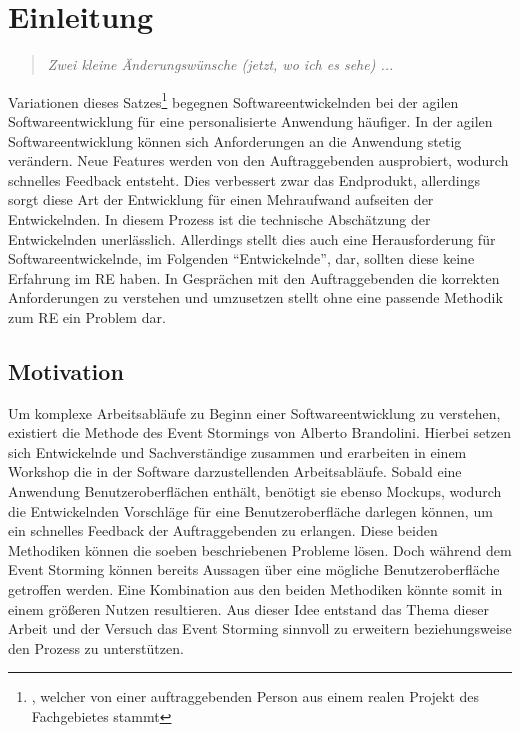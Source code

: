 \chapter{Einleitung}\label{ch:einleitung}

\begin{quote}
    \textit{Zwei kleine Änderungswünsche (jetzt, wo ich es sehe) ...}
\end{quote}


Variationen dieses Satzes\footnote{, welcher von einer auftraggebenden Person aus einem realen Projekt des Fachgebietes stammt}
begegnen Softwareentwickelnden bei der agilen Softwareentwicklung für eine personalisierte Anwendung häufiger.
In der agilen Softwareentwicklung können sich Anforderungen an die Anwendung stetig verändern.
Neue Features werden von den Auftraggebenden ausprobiert, wodurch schnelles Feedback entsteht.
Dies verbessert zwar das Endprodukt, allerdings sorgt diese Art der Entwicklung für einen Mehraufwand aufseiten der Entwickelnden.
In diesem Prozess ist die technische Abschätzung der Entwickelnden unerlässlich.
Allerdings stellt dies auch eine Herausforderung für Softwareentwickelnde, im Folgenden ``Entwickelnde'', dar, sollten diese keine Erfahrung im
\ac{RE} haben.
In Gesprächen mit den Auftraggebenden die korrekten Anforderungen zu verstehen und umzusetzen stellt ohne eine passende Methodik zum
\ac{RE} ein Problem dar.

\section{Motivation}\label{sec:motivation}
Um komplexe Arbeitsabläufe zu Beginn einer Softwareentwicklung zu verstehen, existiert die Methode des Event Stormings von Alberto Brandolini.
Hierbei setzen sich Entwickelnde und Sachverständige zusammen und erarbeiten in einem Workshop die in der Software darzustellenden Arbeitsabläufe.
Sobald eine Anwendung Benutzeroberflächen enthält, benötigt sie ebenso Mockups, wodurch die Entwickelnden Vorschläge für eine Benutzeroberfläche
darlegen können, um ein schnelles Feedback der Auftraggebenden zu erlangen.
Diese beiden Methodiken können die soeben beschriebenen Probleme lösen.
Doch während dem Event Storming können bereits Aussagen über eine mögliche Benutzeroberfläche getroffen werden.
Eine Kombination aus den beiden Methodiken könnte somit in einem größeren Nutzen resultieren.
Aus dieser Idee entstand das Thema dieser Arbeit und der Versuch das Event Storming sinnvoll zu erweitern beziehungsweise den Prozess zu unterstützen.

